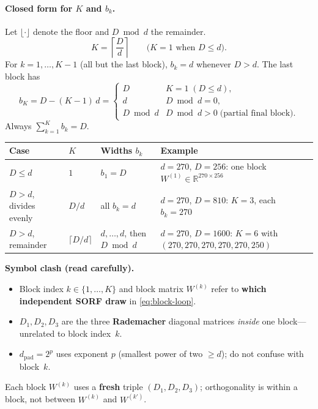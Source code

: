 \documentclass[11pt]{article}
\begin{document}
\paragraph{Closed form for $K$ and $b_k$.}
Let $\lfloor\cdot\rfloor$ denote the floor and $D\bmod d$ the remainder.
\begin{equation}
  \label{eq:K-bk}
  K = \left\lceil \frac{D}{d} \right\rceil
  \qquad
  \text{($K=1$ when $D\le d$).}
\end{equation}
For $k=1,\ldots,K-1$ (all but the last block), $b_k = d$ whenever $D>d$.
The last block has
\begin{equation}
  b_K = D - (K-1)\,d
  = \begin{cases}
      D & K=1 \;(D\le d), \\
      d & D\bmod d = 0, \\
      D\bmod d & D\bmod d > 0 \;\text{(partial final block)}.
    \end{cases}
\end{equation}
Always $\sum_{k=1}^{K} b_k = D$.

\begin{center}
\small
\renewcommand{\arraystretch}{1.3}
\begin{tabular}{@{}p{}p{}p{}p{}@{}}
\toprule
\textbf{Case} & \textbf{$K$} & \textbf{Widths $b_k$} & \textbf{Example} \\
\midrule
$D \le d$ & $1$ & $b_1=D$ & $d=270$, $D=256$: one block $W^{(1)}\in\mathbb{R}^{270\times 256}$ \\
$D > d$, divides evenly & $D/d$ & all $b_k=d$ & $d=270$, $D=810$: $K=3$, each $b_k=270$ \\
$D > d$, remainder & $\lceil D/d\rceil$ & $d,\ldots,d$, then $D\bmod d$ &
  $d=270$, $D=1600$: $K=6$ with $(270,270,270,270,270,250)$ \\
\bottomrule
\end{tabular}
\end{center}

\begin{diffbox}
\textbf{Symbol clash (read carefully).}
\begin{itemize}[nosep]
  \item Block index $k\in\{1,\ldots,K\}$ and block matrix $W^{(k)}$ refer to \textbf{which independent SORF draw} in \eqref{eq:block-loop}.
  \item $D_1,D_2,D_3$ are the three \textbf{Rademacher} diagonal matrices \emph{inside} one block---unrelated to block index~$k$.
  \item $d_{\mathrm{pad}}=2^{p}$ uses exponent $p$ (smallest power of two $\ge d$); do not confuse with block~$k$.
\end{itemize}
Each block $W^{(k)}$ uses a \textbf{fresh} triple $(D_1,D_2,D_3)$; orthogonality is within a block, not between $W^{(k)}$ and $W^{(k')}$.
\end{diffbox}
\end{document}

